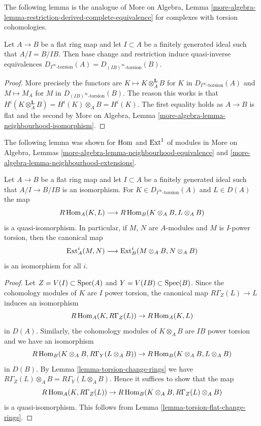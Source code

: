 \noindent
The following lemma is the analogue of
More on Algebra, Lemma
\ref{more-algebra-lemma-restriction-derived-complete-equivalence}
for complexes with torsion cohomologies.

\begin{lemma}
\label{lemma-torsion-flat-change-rings}
Let $A \to B$ be a flat ring map and let $I \subset A$ be a finitely
generated ideal such that $A/I = B/IB$. Then base change and
restriction induce quasi-inverse equivalences
$D_{I^\infty\text{-torsion}}(A) = D_{(IB)^\infty\text{-torsion}}(B)$.
\end{lemma}

\begin{proof}
More precisely the functors are $K \mapsto K \otimes_A^\mathbf{L} B$
for $K$ in $D_{I^\infty\text{-torsion}}(A)$ and $M \mapsto M_A$
for $M$ in $D_{(IB)^\infty\text{-torsion}}(B)$. The reason this works
is that $H^i(K \otimes_A^\mathbf{L} B) = H^i(K) \otimes_A B = H^i(K)$.
The first equality holds as $A \to B$ is flat and the second by
More on Algebra, Lemma \ref{more-algebra-lemma-neighbourhood-isomorphism}.
\end{proof}

\noindent
The following lemma was shown for $\mathop{\mathrm{Hom}}\nolimits$ and $\mathop{\mathrm{Ext}}\nolimits^1$ of modules in
More on Algebra, Lemmas \ref{more-algebra-lemma-neighbourhood-equivalence} and
\ref{more-algebra-lemma-neighbourhood-extensions}.

\begin{lemma}
\label{lemma-neighbourhood-extensions}
Let $A \to B$ be a flat ring map and let $I \subset A$ be a
finitely generated ideal such that $A/I \to B/IB$ is an isomorphism.
For $K \in D_{I^\infty\text{-torsion}}(A)$ and $L \in D(A)$
the map
$$
R\mathop{\mathrm{Hom}}\nolimits_A(K, L) \longrightarrow R\mathop{\mathrm{Hom}}\nolimits_B(K \otimes_A B, L \otimes_A B)
$$
is a quasi-isomorphism. In particular, if $M$, $N$ are $A$-modules and
$M$ is $I$-power torsion, then the canonical map
$$
\mathop{\mathrm{Ext}}\nolimits^i_A(M, N)
\longrightarrow
\mathop{\mathrm{Ext}}\nolimits^i_B(M \otimes_A B, N \otimes_A B)
$$
is an isomorphism for all $i$. 
\end{lemma}

\begin{proof}
Let $Z = V(I) \subset \mathop{\mathrm{Spec}}(A)$ and $Y = V(IB) \subset \mathop{\mathrm{Spec}}(B)$.
Since the cohomology modules of $K$ are $I$ power torsion, the
canonical map $R\Gamma_Z(L) \to L$ induces an isomorphism
$$
R\mathop{\mathrm{Hom}}\nolimits_A(K, R\Gamma_Z(L)) \to R\mathop{\mathrm{Hom}}\nolimits_A(K, L)
$$
in $D(A)$. Similarly, the cohomology modules of $K \otimes_A B$ are
$IB$ power torsion and we have an isomorphism
$$
R\mathop{\mathrm{Hom}}\nolimits_B(K \otimes_A B, R\Gamma_Y(L \otimes_A B)) \to 
R\mathop{\mathrm{Hom}}\nolimits_B(K \otimes_A B, L \otimes_A B)
$$
in $D(B)$.
By Lemma \ref{lemma-torsion-change-rings} we have
$R\Gamma_Z(L) \otimes_A B = R\Gamma_Y(L \otimes_A B)$.
Hence it suffices to show that the map
$$
R\mathop{\mathrm{Hom}}\nolimits_A(K, R\Gamma_Z(L)) \to R\mathop{\mathrm{Hom}}\nolimits_B(K \otimes_A B, R\Gamma_Z(L) \otimes_A B)
$$
is a quasi-isomorphism. This follows from
Lemma \ref{lemma-torsion-flat-change-rings}.
\end{proof}




